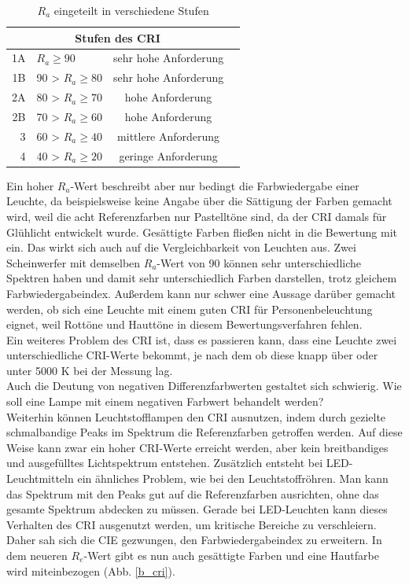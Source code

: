 	\begin{table}[htp] 
		\centering
		\begin{tabular}{rlcc}  %
		\toprule
		\multicolumn{3}{c}{\large\sffamily Stufen des CRI}\\ 							
		\midrule
		1A & $R_{a} \geq 90$ & sehr hohe Anforderung\\ 
		1B & 90 > $R_{a} \geq 80$ & sehr hohe Anforderung\\
		2A & 80 > $R_{a} \geq 70$ & hohe Anforderung\\
		2B & 70 > $R_{a} \geq 60$ & hohe Anforderung\\
		3 & 60 > $R_{a} \geq 40$ & mittlere Anforderung\\
		4 & 40 > $R_{a} \geq 20$ & geringe Anforderung\\
		\bottomrule
		\end{tabular}
		\caption{$R_{a}$ eingeteilt in verschiedene Stufen\protect\footnotemark}	
		\label{t_cri}
	\end{table}

\noindent Ein hoher $R_{a}$-Wert beschreibt aber nur bedingt die Farbwiedergabe einer Leuchte, da beispielsweise keine Angabe über die Sättigung der Farben gemacht wird, weil die acht Referenzfarben nur Pastelltöne sind, da der CRI damals für Glühlicht entwickelt wurde. Gesättigte Farben fließen nicht in die Bewertung mit ein.
Das wirkt sich auch auf die Vergleichbarkeit von Leuchten aus. Zwei Scheinwerfer mit demselben $R_{a}$-Wert von 90 können sehr unterschiedliche Spektren haben und damit sehr unterschiedlich Farben darstellen, trotz gleichem Farbwiedergabeindex.
Außerdem kann nur schwer eine Aussage darüber gemacht werden, ob sich eine Leuchte mit einem guten CRI für Personenbeleuchtung eignet, weil Rottöne und Hauttöne in diesem Bewertungsverfahren fehlen.\\
Ein weiteres Problem des CRI ist, dass es passieren kann, dass eine Leuchte zwei unterschiedliche CRI-Werte bekommt, je nach dem ob diese knapp über oder unter 5000 K bei der Messung lag.\\
Auch die Deutung von negativen Differenzfarbwerten gestaltet sich schwierig. Wie soll eine Lampe mit einem negativen Farbwert behandelt werden?\\
Weiterhin können Leuchtstofflampen den CRI ausnutzen, indem durch gezielte schmalbandige Peaks im Spektrum die Referenzfarben getroffen werden. Auf diese Weise kann zwar ein hoher CRI-Werte erreicht werden, aber kein breitbandiges und ausgefülltes Lichtspektrum entstehen. Zusätzlich entsteht bei LED-Leuchtmitteln ein ähnliches Problem, wie bei den Leuchtstoffröhren. Man kann das Spektrum mit den Peaks gut auf die Referenzfarben ausrichten, ohne das gesamte Spektrum abdecken zu müssen. Gerade bei LED-Leuchten kann dieses Verhalten des CRI ausgenutzt werden, um kritische Bereiche zu verschleiern. Daher sah sich die CIE gezwungen, den Farbwiedergabeindex zu erweitern. In dem neueren $R_{e}$-Wert gibt es nun auch gesättigte Farben und eine Hautfarbe wird miteinbezogen (Abb. \ref{b_cri}).

